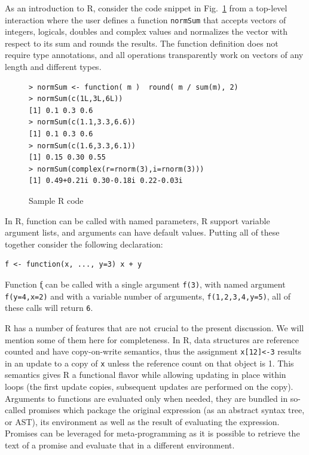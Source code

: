 \documentclass[acmsmall,10pt,review,anonymous]{acmart}\settopmatter{printfolios=true,printccs=false,printacmref=false}
\newcommand{\code}[1]{\lstinline|#1|\xspace}
\begin{document}
As an introduction to R, consider the code snippet in Fig.~\ref{sample} from
a top-level interaction where the user defines a function \code{normSum}
that accepts vectors of integers, logicals, doubles and complex values and
normalizes the vector with respect to its sum and rounds the results. The
function definition does not require type annotations, and all operations
transparently work on vectors of any length and different types.

\begin{figure}[!hb]{\small
\begin{lstlisting}[style=R]
> normSum <- function( m )  round( m / sum(m), 2)
> normSum(c(1L,3L,6L))
[1] 0.1 0.3 0.6
> normSum(c(1.1,3.3,6.6))
[1] 0.1 0.3 0.6
> normSum(c(1.6,3.3,6.1))
[1] 0.15 0.30 0.55
> normSum(complex(r=rnorm(3),i=rnorm(3)))
[1] 0.49+0.21i 0.30-0.18i 0.22-0.03i
\end{lstlisting}}
\caption{Sample R code}\label{sample}
\end{figure}

In R, function can be called with named parameters, R support variable
argument lists, and arguments can have default values. Putting all of these
together consider the following declaration:

\begin{lstlisting}[style=R]
f <- function(x, ..., y=3) x + y
\end{lstlisting}

\noindent
Function \k{f} can be called with a single argument \code{f(3)}, with named
argument \code{f(y=4,x=2)} and with a variable number of arguments,
\code{f(1,2,3,4,y=5)}, all of these calls will return \code{6}.

R has a number of features that are not crucial to the present
discussion. We will mention some of them here for completeness.  In R, data
structures are reference counted and have copy-on-write semantics, thus the
assignment \code{x[12]<-3} results in an update to a copy of \code{x} unless
the reference count on that object is 1.  This semantics gives R a
functional flavor while allowing updating in place within loops (the first
update copies, subsequent updates are performed on the copy). Arguments to
functions are evaluated only when needed, they are bundled in so-called
promises which package the original expression (as an abstract syntax tree, or AST), its environment
as well as the result of evaluating the expression. Promises can be
leveraged for meta-programming as it is possible to retrieve the text of a
promise and evaluate that in a different environment.
\end{document}
